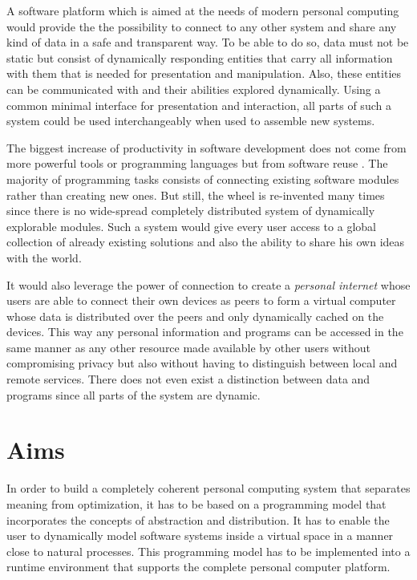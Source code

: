 A software platform which is aimed at the needs of modern personal computing would provide the the possibility to connect to any other system and share any kind of data in a safe and transparent way. To be able to do so, data must not be static but consist of dynamically responding entities that carry all information with them that is needed for presentation and manipulation. Also, these entities can be communicated with and their abilities explored dynamically. Using a common minimal interface for presentation and interaction, all parts of such a system could be used interchangeably when used to assemble new systems.

The biggest increase of productivity in software development does not come from more powerful tools or programming languages but from software reuse \cite{SilverBullet}. The majority of programming tasks consists of connecting existing software modules rather than creating new ones. But still, the wheel is re-invented many times since there is no wide-spread completely distributed system of dynamically explorable modules. Such a system would give every user access to a global collection of already existing solutions and also the ability to share his own ideas with the world.

It would also leverage the power of connection to create a \textit{personal internet} whose users are able to connect their own devices as peers to form a virtual computer whose data is distributed over the peers and only dynamically cached on the devices. This way any personal information and programs can be accessed in the same manner as any other resource made available by other users without compromising privacy but also without having to distinguish between local and remote services. There does not even exist a distinction between data and programs since all parts of the system are dynamic.

\section{Aims}

In order to build a completely coherent personal computing system that separates meaning from optimization, it has to be based on a programming model that incorporates the concepts of abstraction and distribution. It has to enable the user to dynamically model software systems inside a virtual space in a manner close to natural processes. This programming model has to be implemented into a runtime environment that supports the complete personal computer platform.

